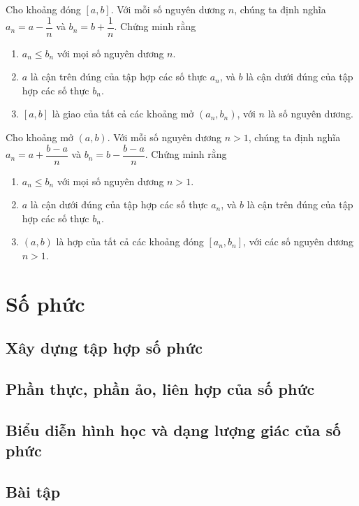 \begin{exercise}
    Cho khoảng đóng $[a, b]$. Với mỗi số nguyên dương $n$, chúng ta định nghĩa $a_{n} = a - \dfrac{1}{n}$ và $b_{n} = b + \dfrac{1}{n}$. Chứng minh rằng 
    \begin{enumerate}[label={(\roman*)}]
        \item $a_{n}\leq b_{n}$ với mọi số nguyên dương $n$.
        \item $a$ là cận trên đúng của tập hợp các số thực $a_{n}$, và $b$ là cận dưới đúng của tập hợp các số thực $b_{n}$.
        \item $[a, b]$ là giao của tất cả các khoảng mở $(a_{n}, b_{n})$, với $n$ là số nguyên dương.
    \end{enumerate}
\end{exercise}


\begin{exercise}
    Cho khoảng mở $(a, b)$. Với mỗi số nguyên dương $n > 1$, chúng ta định nghĩa $a_{n} = a + \dfrac{b-a}{n}$ và $b_{n} = b - \dfrac{b-a}{n}$. Chứng minh rằng 
    \begin{enumerate}[label={(\roman*)}]
        \item $a_{n}\leq b_{n}$ với mọi số nguyên dương $n > 1$.
        \item $a$ là cận dưới đúng của tập hợp các số thực $a_{n}$, và $b$ là cận trên đúng của tập hợp các số thực $b_{n}$.
        \item $(a, b)$ là hợp của tất cả các khoảng đóng $[a_{n}, b_{n}]$, với các số nguyên dương $n > 1$.
    \end{enumerate}
\end{exercise}

\section{Số phức}

\subsection{Xây dựng tập hợp số phức}

\subsection{Phần thực, phần ảo, liên hợp của số phức}

\subsection{Biểu diễn hình học và dạng lượng giác của số phức}

\subsection{Bài tập}
